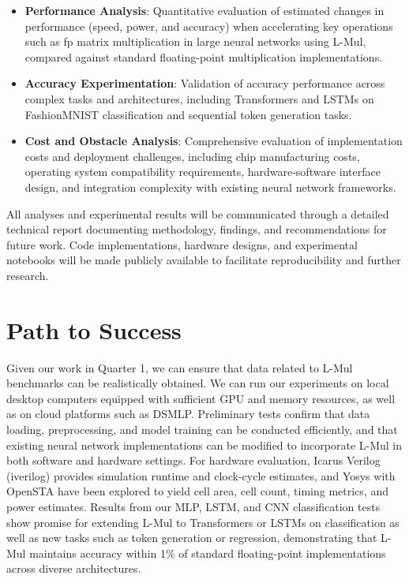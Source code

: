 \documentclass[12pt,letterpaper]{article}
\begin{document}
\begin{itemize}
    \item \textbf{Performance Analysis}: Quantitative evaluation of estimated changes in performance (speed, power, and accuracy) when accelerating key operations such as fp matrix multiplication in large neural networks using L-Mul, compared against standard floating-point multiplication implementations.
    
    \item \textbf{Accuracy Experimentation}: Validation of accuracy performance across complex tasks and architectures, including Transformers and LSTMs on FashionMNIST classification and sequential token generation tasks.
    
    \item \textbf{Cost and Obstacle Analysis}: Comprehensive evaluation of implementation costs and deployment challenges, including chip manufacturing costs, operating system compatibility requirements, hardware-software interface design, and integration complexity with existing neural network frameworks.
\end{itemize}
All analyses and experimental results will be communicated through a detailed technical report documenting methodology, findings, and recommendations for future work. Code implementations, hardware designs, and experimental notebooks will be made publicly available to facilitate reproducibility and further research.

\section{Path to Success}

Given our work in Quarter 1, we can ensure that data related to L-Mul benchmarks can be realistically obtained. We can run our experiments on local desktop computers equipped with sufficient GPU and memory resources, as well as on cloud platforms such as DSMLP. Preliminary tests confirm that data loading, preprocessing, and model training can be conducted efficiently, and that existing neural network implementations can be modified to incorporate L-Mul in both software and hardware settings. For hardware evaluation, Icarus Verilog (iverilog) provides simulation runtime and clock-cycle estimates, and Yosys with OpenSTA have been explored to yield cell area, cell count, timing metrics, and power estimates. Results from our MLP, LSTM, and CNN classification tests show promise for extending L-Mul to Transformers or LSTMs on classification as well as new tasks such as token generation or regression, demonstrating that L-Mul maintains accuracy within 1\% of standard floating-point implementations across diverse architectures.


\makereference


\end{document}
